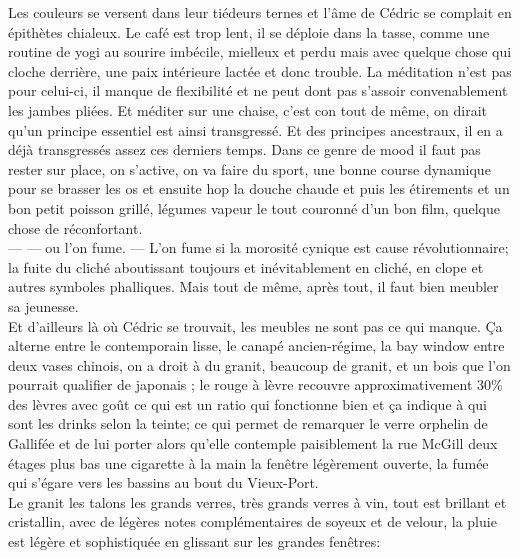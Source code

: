 \documentclass{article}
\begin{document}
Les couleurs se versent dans leur tiédeurs ternes et l'âme de Cédric se complait
en épithètes chialeux. Le café est trop lent, il se déploie dans la tasse, comme
une routine de yogi au sourire imbécile, mielleux et perdu mais avec quelque
chose qui cloche derrière, une paix intérieure lactée et donc trouble. La
méditation n'est pas pour celui-ci, il manque de flexibilité et ne peut dont pas
s'assoir convenablement les jambes pliées. Et méditer sur une chaise, c'est con
tout de même, on dirait qu'un principe essentiel est ainsi transgressé. Et des
principes ancestraux, il en a déjà transgressés assez ces derniers temps. Dans
ce genre de mood il faut pas rester sur place, on s'active, on va faire du
sport, une bonne course dynamique pour se brasser les os et ensuite hop la
douche chaude et puis les étirements et un bon petit poisson grillé, légumes
vapeur le tout couronné d'un bon film, quelque chose de réconfortant. \\--- ---
ou l'on fume. --- L'on fume si la morosité cynique est cause révolutionnaire; la
fuite du cliché aboutissant toujours et inévitablement en cliché, en clope et
autres symboles phalliques. Mais tout de même, après tout, il faut bien meubler
sa jeunesse. \\

Et d'ailleurs là où Cédric se trouvait, les meubles ne sont pas ce qui manque.
Ça alterne entre le contemporain lisse, le canapé ancien-régime, la bay window
entre deux vases chinois, on a droit à du granit, beaucoup de granit, et un bois
que l'on pourrait qualifier de japonais ; le rouge à lèvre recouvre
approximativement 30\% des lèvres avec goût ce qui est un ratio qui fonctionne
bien et ça indique à qui sont les drinks selon la teinte; ce qui permet de
remarquer le verre orphelin de Gallifée et de lui porter alors qu'elle contemple
paisiblement la rue McGill deux étages plus bas une cigarette à la main la
fenêtre légèrement ouverte, la fumée qui s'égare vers les bassins au bout du Vieux-Port.
\\Le granit les talons les grands verres, très grands verres à vin, tout est
brillant et cristallin, avec de légères notes complémentaires de soyeux et de
velour, la pluie est légère et sophistiquée en glissant sur les grandes
fenêtres:
\end{document}
